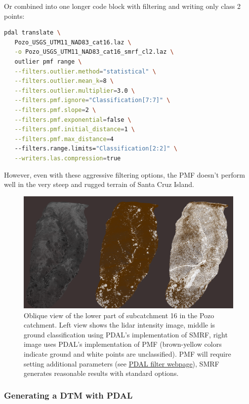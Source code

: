 \documentclass[a4paperpaper,,tablecaptionabove]{scrartcl}
\begin{document}
Or combined into one longer code block with filtering and writing only
class 2 points:

\begin{lstlisting}[language=bash]
pdal translate \
   Pozo_USGS_UTM11_NAD83_cat16.laz \
   -o Pozo_USGS_UTM11_NAD83_cat16_smrf_cl2.laz \
   outlier pmf range \
   --filters.outlier.method="statistical" \
   --filters.outlier.mean_k=8 \
   --filters.outlier.multiplier=3.0 \
   --filters.pmf.ignore="Classification[7:7]" \
   --filters.pmf.slope=2 \
   --filters.pmf.exponential=false \
   --filters.pmf.initial_distance=1 \
   --filters.pmf.max_distance=4
   --filters.range.limits="Classification[2:2]" \
   --writers.las.compression=true
\end{lstlisting}

However, even with these aggressive filtering options, the PMF doesn't
perform well in the very steep and rugged terrain of Santa Cruz Island.

\begin{figure}
\centering
\includegraphics{./tex2pdf.-e6884bf2dada0f3b/6f9b83a6cc07396761bc6c7a3994c70088d3fbac.png}
\caption{Oblique view of the lower part of subcatchment 16 in the Pozo
catchment. Left view shows the lidar intensity image, middle is ground
classification using PDAL's implementation of SMRF, right image uses
PDAL's implementation of PMF (brown-yellow colors indicate ground and
white points are unclassified). PMF will require setting additional
parameters (see \href{https://pdal.io/stages/filters.pmf.html}{PDAL
filter webpage}), SMRF generates reasonable results with standard
options.\label{Fig:PC_cat16_intensity_smrf_pmf_classification}}
\end{figure}

\hypertarget{generating-a-dtm-with-pdal}{%
\subsubsection{Generating a DTM with
PDAL}\label{generating-a-dtm-with-pdal}}
\end{document}
